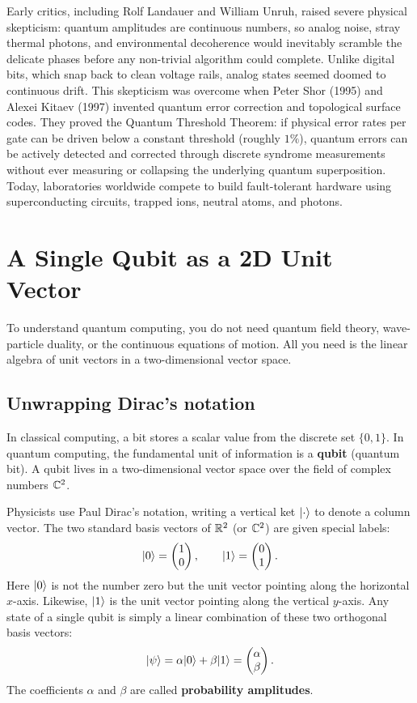 \begin{historybox}
Early critics, including Rolf Landauer and William Unruh, raised severe physical
skepticism: quantum amplitudes are continuous numbers, so analog noise, stray
thermal photons, and environmental decoherence would inevitably scramble the delicate
phases before any non-trivial algorithm could complete. Unlike digital bits, which
snap back to clean voltage rails, analog states seemed doomed to continuous drift.
This skepticism was overcome when Peter Shor (1995) and Alexei Kitaev (1997)
invented quantum error correction and topological surface codes. They proved the
Quantum Threshold Theorem: if physical error rates per gate can be driven below a
constant threshold (roughly $1\%$), quantum errors can be actively detected and
corrected through discrete syndrome measurements without ever measuring or
collapsing the underlying quantum superposition. Today, laboratories worldwide
compete to build fault-tolerant hardware using superconducting circuits, trapped ions, neutral atoms, and photons.
\end{historybox}

\section{A Single Qubit as a 2D Unit Vector}
\label{ch42:single-qubit}

To understand quantum computing, you do not need quantum field theory, wave-particle
duality, or the continuous equations of motion. All you need is the linear algebra of unit
vectors in a two-dimensional vector space.

\subsection{Unwrapping Dirac's notation}

In classical computing, a bit stores a scalar value from the discrete set $\{0, 1\}$.
In quantum computing, the fundamental unit of information is a \textbf{qubit}
(quantum bit). A qubit lives in a two-dimensional vector space over the field of
complex numbers $\mathbb{C}^2$.

Physicists use Paul Dirac's notation, writing a vertical ket $\lvert \cdot \rangle$ to denote
a column vector. The two standard basis vectors of $\mathbb{R}^2$ (or $\mathbb{C}^2$) are given
special labels:
\[
  \lvert 0 \rangle = \begin{pmatrix}1 \\ 0\end{pmatrix}, \qquad \lvert 1 \rangle = \begin{pmatrix}0 \\ 1\end{pmatrix}.
\]
Here $\lvert 0 \rangle$ is not the number zero but the unit vector pointing
along the horizontal $x$-axis. Likewise, $\lvert 1 \rangle$ is the unit vector pointing along
the vertical $y$-axis. Any state of a single qubit is simply a linear combination of
these two orthogonal basis vectors:
\[
  \lvert \psi \rangle = \alpha\lvert 0 \rangle + \beta\lvert 1 \rangle = \begin{pmatrix}\alpha \\ \beta\end{pmatrix}.
\]
The coefficients $\alpha$ and $\beta$ are called \textbf{probability amplitudes}.


